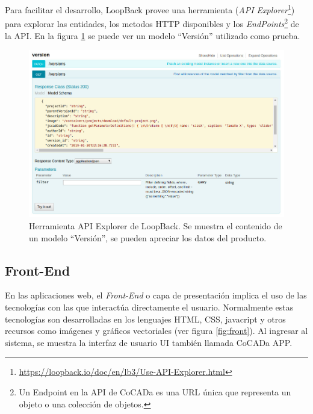 Para facilitar el desarrollo, LoopBack provee una herramienta (\textit{API Explorer}\footnote{\url{https://loopback.io/doc/en/lb3/Use-API-Explorer.html}}) para explorar las entidades, los metodos HTTP disponibles y los \textit{EndPoints}\footnote{Un Endpoint en la API de CoCADa es una URL única que representa un objeto o una colección de objetos.} de la API. En la figura \ref{fig:explorer} se puede ver un modelo ``Versión'' utilizado como prueba.

\begin{figure}[ht]
    \includegraphics[width=16cm]{Img/Desarrollo/strong.jpg}
    \centering
    \caption{\footnotesize{Herramienta API Explorer de LoopBack. Se muestra el contenido de un modelo ``Versión'', se pueden apreciar los datos del producto.}}
    \label{fig:explorer}
\end{figure}

\clearpage
\subsection{Front-End}
\label{front}
En las aplicaciones web, el \textit{Front-End} o capa de presentación implica el uso de las tecnologías con las que interactúa directamente el usuario. Normalmente estas tecnologías son desarrolladas en los lenguajes HTML, CSS, javacript y otros recursos como imágenes y gráficos vectoriales (ver figura \ref{fig:front}). Al ingresar al sistema, se muestra la interfaz de usuario UI también llamada CoCADa APP.

